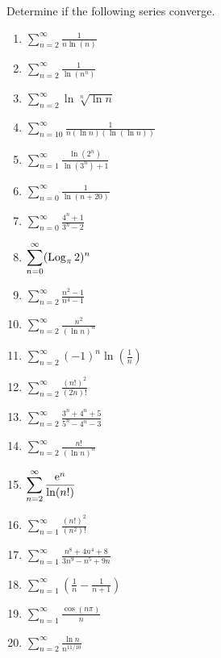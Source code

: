 {\begin{Exercise}
\end{Exercise}



\begin{Exercise}
  \label{exercise convergence 1/ ln(nn)}
  Determine if the following series converge.
  \begin{enumerate}
  \item
    $\displaystyle \sum_{n=2}^\infty \frac{1}{n \ln(n)}$
  \item
    $\displaystyle \sum_{n=2}^\infty \frac{1}{\ln \left( n^n \right)}$
  \item
    $\displaystyle \sum_{n=2}^\infty \ln \sqrt[n]{\ln n}$
  \item
    $\displaystyle \sum_{n=10}^\infty \frac{1}{ n (\ln n) (\ln(\ln n)) }$
  \item
    $\displaystyle \sum_{n=1}^\infty \frac{ \ln \left( 2^n \right) }
    { \ln \left( 3^n \right) + 1 }$
  \item
    $\displaystyle \sum_{n=0}^\infty \frac{1}{\ln(n + 20)}$
  \item
    $\displaystyle \sum_{n=0}^\infty \frac{4^n + 1}{3^n - 2}$
  \item
    $\displaystyle \sum_{n=0}^\infty (\mathop{\mathrm{Log}}\nolimits_\pi 2)^n$
  \item
    $\displaystyle \sum_{n=2}^\infty \frac{n^2 - 1}{n^4 - 1}$
  \item
    $\displaystyle \sum_{n=2}^\infty \frac{n^2}{(\ln n)^n}$
  \item
    $\displaystyle \sum_{n=2}^\infty (-1)^n \ln \left( \frac{1}{n} \right)$
  \item
    $\displaystyle \sum_{n=2}^\infty \frac{ (n!)^2 }{ (2 n)! }$
  \item
    $\displaystyle \sum_{n=2}^\infty \frac{3^n + 4^n + 5}{5^n - 4^n - 3}$
  \item
    $\displaystyle \sum_{n=2}^\infty \frac{ n! }{ (\ln n)^n }$
  \item
    $\displaystyle \sum_{n=2}^\infty \frac{\mathop{\mathrm{e}}\nolimits^n}{\ln(n!)}$
  \item
    $\displaystyle \sum_{n=1}^\infty \frac{ (n!)^2 }{ (n^2)! }$
  \item
    $\displaystyle \sum_{n=1}^\infty \frac{n^8 + 4 n^4 + 8}{3 n^9 - n^5 + 9 n}$
  \item
    $\displaystyle \sum_{n=1}^\infty \left( \frac{1}{n} - \frac{1}{n+1} \right)$
  \item
    $\displaystyle \sum_{n=1}^\infty \frac{\cos( n \pi )}{n}$
  \item
    $\displaystyle \sum_{n=2}^\infty \frac{ \ln n }{ n^{11/10} }$
  \end{enumerate}


\end{Exercise}}
